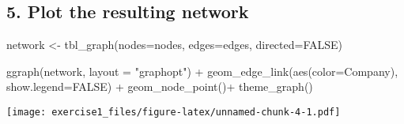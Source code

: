 \documentclass[
]{article}
\newenvironment{Shaded}{\begin{snugshade}}{\end{snugshade}}
\newcommand{\AttributeTok}[1]{\textcolor[rgb]{0.77,0.63,0.00}{#1}}
\newcommand{\ConstantTok}[1]{\textcolor[rgb]{0.00,0.00,0.00}{#1}}
\newcommand{\FunctionTok}[1]{\textcolor[rgb]{0.00,0.00,0.00}{#1}}
\newcommand{\NormalTok}[1]{#1}
\newcommand{\OtherTok}[1]{\textcolor[rgb]{0.56,0.35,0.01}{#1}}
\newcommand{\SpecialCharTok}[1]{\textcolor[rgb]{0.00,0.00,0.00}{#1}}
\newcommand{\StringTok}[1]{\textcolor[rgb]{0.31,0.60,0.02}{#1}}
\begin{document}
\hypertarget{plot-the-resulting-network}{%
\subsection{5. Plot the resulting
network}\label{plot-the-resulting-network}}

\begin{Shaded}
\begin{Highlighting}[]
\NormalTok{network }\OtherTok{\textless{}{-}} \FunctionTok{tbl\_graph}\NormalTok{(}\AttributeTok{nodes=}\NormalTok{nodes, }\AttributeTok{edges=}\NormalTok{edges, }\AttributeTok{directed=}\ConstantTok{FALSE}\NormalTok{)}

\FunctionTok{ggraph}\NormalTok{(network, }\AttributeTok{layout =} \StringTok{"graphopt"}\NormalTok{) }\SpecialCharTok{+} 
  \FunctionTok{geom\_edge\_link}\NormalTok{(}\FunctionTok{aes}\NormalTok{(}\AttributeTok{color=}\NormalTok{Company), }\AttributeTok{show.legend=}\ConstantTok{FALSE}\NormalTok{) }\SpecialCharTok{+} 
  \FunctionTok{geom\_node\_point}\NormalTok{()}\SpecialCharTok{+}
  \FunctionTok{theme\_graph}\NormalTok{()}
\end{Highlighting}
\end{Shaded}

\texttt{[image: exercise1\_files/figure-latex/unnamed-chunk-4-1.pdf]}
\end{document}
